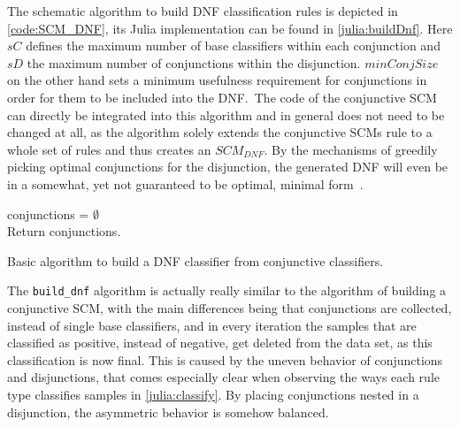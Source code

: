 The schematic algorithm to build DNF classification rules is depicted in \autoref{code:SCM_DNF}, its Julia implementation can be found in \autoref{julia:buildDnf}.
Here \(sC\) defines the maximum number of base classifiers within each conjunction and \(sD\) the maximum number of conjunctions within the disjunction.
\(minConjSize\) on the other hand sets a minimum usefulness requirement for conjunctions in order for them to be included into the DNF.\
The code of the conjunctive SCM can directly be integrated into this algorithm and in general does not need to be changed at all,
as the algorithm solely extends the conjunctive SCMs rule to a whole set of rules and thus creates an \(SCM_{DNF}\).
By the mechanisms of greedily picking optimal conjunctions for the disjunction, the generated DNF will even be in a somewhat, yet not
guaranteed to be optimal, minimal form~\citep{allender}.

\begin{algorithm}[ht]
    conjunctions = \(\emptyset\) \\
    Return conjunctions.
    \caption{Basic algorithm to build a DNF classifier from conjunctive classifiers.}\label{code:SCM_DNF}
\end{algorithm}

The \texttt{build\_dnf} algorithm is actually really similar to the algorithm of building a conjunctive SCM, with the main differences being
that conjunctions are collected, instead of single base classifiers, and in every iteration the samples that are classified as positive,
instead of negative, get deleted from the data set, as this classification is now final.
This is caused by the uneven behavior of conjunctions and disjunctions, that comes especially clear when observing
the ways each rule type classifies samples in \autoref{julia:classify}.
By placing conjunctions nested in a disjunction, the asymmetric behavior is somehow balanced.

